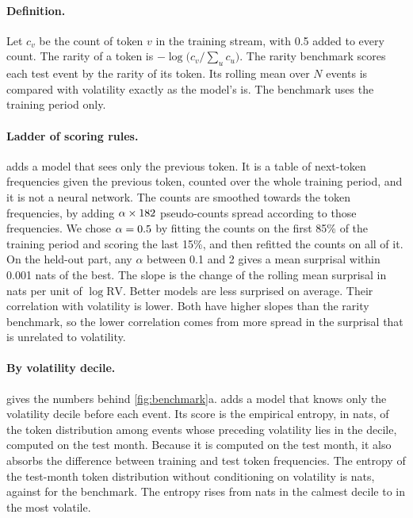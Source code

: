 \documentclass[11pt]{article}
\newcommand{\RV}{\mathrm{RV}}
\begin{document}
\paragraph{Definition.}
Let $c_v$ be the count of token $v$ in the training stream, with 0.5 added to every count.
The rarity of a token is $-\log\bigl(c_v/\sum_u c_u\bigr)$.
The rarity benchmark scores each test event by the rarity of its token.
Its rolling mean over $N$ events is compared with volatility exactly as the model's is.
The benchmark uses the training period only.

\paragraph{Ladder of scoring rules.}
 adds a model that sees only the previous token.
It is a table of next-token frequencies given the previous token, counted over the whole training period, and it is not a neural network.
The counts are smoothed towards the token frequencies, by adding $\alpha\times182{}$ pseudo-counts spread according to those frequencies.
We chose $\alpha=0.5{}$ by fitting the counts on the first 85\% of the training period and scoring the last 15\%, and then refitted the counts on all of it.
On the held-out part, any $\alpha$ between 0.1 and 2 gives a mean surprisal within 0.001 nats of the best.
The slope is the change of the rolling mean surprisal in nats per unit of $\log\RV$.
Better models are less surprised on average.
Their correlation with volatility is lower.
Both have higher slopes than the rarity benchmark, so the lower correlation comes from more spread in the surprisal that is unrelated to volatility.

\begin{table}[h]
\centering\small

\caption{Three scoring rules on the test month. ``Flagged minus rest'' is the difference in mean rolling surprisal between flagged and unflagged events.}
\label{tab:ladder}
\end{table}

\paragraph{By volatility decile.}
 gives the numbers behind \cref{fig:benchmark}a.
 adds a model that knows only the volatility decile before each event.
Its score is the empirical entropy, in nats, of the token distribution among events whose preceding volatility lies in the decile, computed on the test month.
Because it is computed on the test month, it also absorbs the difference between training and test token frequencies.
The entropy of the test-month token distribution without conditioning on volatility is \EntFlat{} nats, against \MeanRar{} for the benchmark.
The entropy rises from \EntLow{} nats in the calmest decile to \EntHigh{} in the most volatile.
\end{document}

